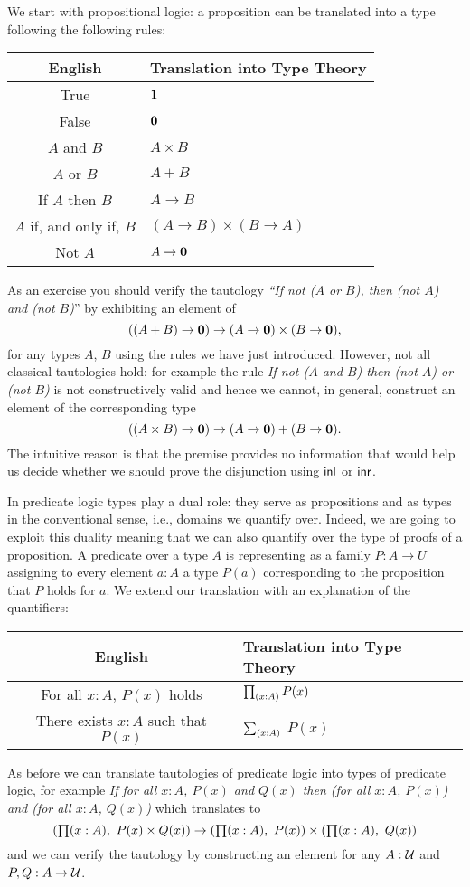 We start with propositional logic: a proposition can be translated into a type following the following rules:
\begin{center}
\begin{tabular}{c|l}
  \textbf{English} & \textbf{Translation into Type Theory}\\\hline
  True & $\mathbf{1}$ \\
  False & $\mathbf{0}$ \\
  $A$ and $B$ & $A \times B$ \\
  $A$ or $B$ & $A + B$ \\
  If $A$ then $B$ & $A \to B$ \\
  $A$ if, and only if, $B$ & $(A \to B) \times (B \to A)$ \\
  Not $A$ &  $A \to \mathbf{0}$
\end{tabular}
\end{center}
As an exercise you should verify 
the tautology \emph{``If not ($A$ or $B$), then  (not $A$) and (not $B$)}'' by exhibiting an element of 
\[ ((A + B) \to \mathbf{0}) \to (A \to \mathbf{0}) \times (B \to \mathbf{0}), \]
for any types $A$, $B$ using the rules we have just introduced. However, not all classical tautologies hold: for example the rule 
\emph{If not ($A$ and $B$) then (not $A$) or (not $B$)} is not constructively valid and hence we cannot, in general, construct an element of the corresponding type
\[ ((A \times B) \to \mathbf{0}) \to (A \to \mathbf{0}) + (B \to \mathbf{0}).\]
The intuitive reason is that the premise provides no information that would help us decide whether we should prove the disjunction using ${\mathsf{inl}}$ or ${\mathsf{inr}}$.

In predicate logic types play a dual role: they serve as propositions and as types in the conventional sense, i.e., domains we quantify over. Indeed, we are going to exploit this duality meaning that we can also quantify over the type of proofs of a proposition. A predicate over a type $A$ is representing as a family $P : A \to U$ assigning to every element $a : A$ a type $P(a)$ corresponding to the proposition that $P$ holds for $a$. We extend our translation with an explanation of the quantifiers:
\begin{center}
\begin{tabular}{c|l}
  \textbf{English} & \textbf{Translation into Type Theory}\\\hline
  For all $x:A$, $P(x)$ holds & $\prd{x:A} P(x)$ \\
  There exists $x:A$ such that $P(x)$ & $\sm{x:A}$ $P(x)$ \\
\end{tabular}
\end{center}
As before we can translate tautologies of predicate logic into types of predicate logic, for example \emph{If for all $x:A$, $P(x)$ and $Q(x)$ then (for all $x:A$, $P(x)$) and  (for all $x:A$, $Q(x)$)  } which translates to
\[ (\prd{x:A} P(x) \times Q(x)) \to (\prd{x:A} P(x)) \times (\prd{x:A} Q(x)) \]
and we can verify the tautology by constructing an element for any $A:\mathcal{U}$ and $P,Q : A \to \mathcal{U}$. 

